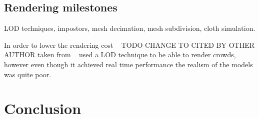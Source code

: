 \documentclass[conference]{acmsiggraph}
\begin{document}
\subsection{Rendering milestones}

LOD techniques, impostors, mesh decimation, mesh subdivision, cloth simulation.

In order to lower the rendering cost ~\cite{pratt1997humans} TODO CHANGE TO CITED BY OTHER AUTHOR taken from ~\cite{Aubel1999} used a LOD technique to be able to render crowds, however even though it  achieved real time performance the realism of the models was quite poor.



\section{Conclusion}



\end{document}
